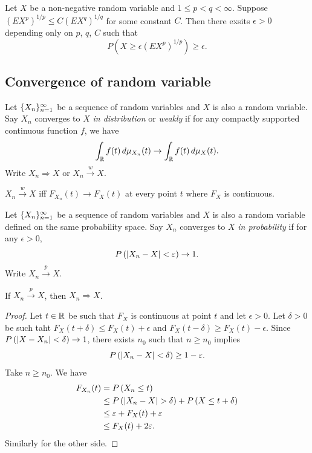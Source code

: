 \documentclass[a4paper]{article}
\newcommand{\convd}{\Rightarrow}
\newcommand{\convw}{\xrightarrow{w}}
\newcommand{\convp}{\xrightarrow{p}}
\begin{document}
\begin{thm}
  Let $X$ be a non-negative random variable and $1 \leq p < q < \infty$.
  Suppose $\left( E X^p \right)^{1 / p} \leq C \left( E X^q \right)^{1 / q}$
  for some constant $C$. Then there exsits $\epsilon > 0$ depending 
  only on $p$, $q$, $C$ such that 
  \[
  P \left( X \geq \epsilon \left( E X^p \right)^{1 / p} \right) 
  \geq \epsilon.
  \]
\end{thm}

\subsection{Convergence of random variable}

\begin{defi}
  Let $\{ X_n \}_{n=1}^\infty$ be a sequence of random variables and $X$ is also 
  a random variable.
  Say $X_n$ converges to $X$ \emph{in distribution} or \emph{weakly} if 
  for any compactly supported continuous function $f$, we have 
  \[
  \int_{\mathbb{R}} f(t) \, d \mu_{X_n} (t) \to \int_{\mathbb{R}} f(t) \, d \mu_X (t).
  \]
  Write $X_n \convd X$ or $X_n \convw X$.
\end{defi}

\begin{prop}
  $X_n \convw X$ iff $F_{X_n} (t) \to F_X (t)$ at every point $t$ 
  where $F_X$ is continuous.
\end{prop}

\begin{defi}
  Let $\{ X_n \}_{n=1}^\infty$ be a sequence of random variables and $X$ is also 
  a random variable defined on the same probability space. 
  Say $X_n$ converges to $X$ \emph{in probability} if 
  for any $\epsilon > 0$, 
  \[
  P \left( \left\lvert X_n - X\right\rvert < \varepsilon \right) \to 1.
  \]
  Write $X_n \convp X$.
\end{defi}

\begin{prop}
  If $X_n \convp X$, then $X_n \convd X$.
\end{prop}

\begin{proof}
  Let $t \in \mathbb{R}$ be such that $F_X$ is continuous at point $t$
  and let $\epsilon > 0$. Let $\delta > 0$ be such taht 
  $F_X (t + \delta) \leq F_X (t) + \epsilon$ and 
  $F_X (t - \delta) \geq F_X (t) - \epsilon$.
  Since $P \left( \left\lvert X - X_n\right\rvert < \delta\right)
  \to 1$, there exists $n_0$ such that $n \geq n_0$ implies 
  \[
  P \left( \left\lvert X_n - X\right\rvert < \delta\right)
  \geq 1 - \varepsilon.
  \]
  Take $n \geq n_0$. We have 
  \begin{align*}
    F_{X_n} (t) 
    &= P \left( X_n \leq t \right) \\
    &\leq P \left( \left\lvert X_n - X\right\rvert > \delta\right)
    + P \left( X \leq t + \delta\right) \\
    &\leq \varepsilon + F_X (t) + \varepsilon \\
    &\leq F_X (t) + 2 \varepsilon.
  \end{align*}
  Similarly for the other side.

\end{proof}
\end{document}
